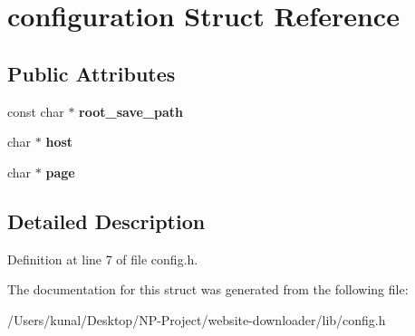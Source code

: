 \hypertarget{structconfiguration}{}\section{configuration Struct Reference}
\label{structconfiguration}
\subsection*{Public Attributes}
\begin{DoxyCompactItemize}
\item 
\mbox{\label{structconfiguration_a5beaeb389c8a1cd5fd44de725c0119e6}} 
const char $\ast$ {\bfseries root\+\_\+save\+\_\+path}
\item 
\mbox{\label{structconfiguration_aa75eac2b632684102dbe7f53c47a3ef0}} 
char $\ast$ {\bfseries host}
\item 
\mbox{\label{structconfiguration_a148fa7b7a75630bf62213190bb4fa699}} 
char $\ast$ {\bfseries page}
\end{DoxyCompactItemize}


\subsection{Detailed Description}


Definition at line 7 of file config.\+h.



The documentation for this struct was generated from the following file\+:\begin{DoxyCompactItemize}
\item 
/\+Users/kunal/\+Desktop/\+N\+P-\/\+Project/website-\/downloader/lib/config.\+h\end{DoxyCompactItemize}
